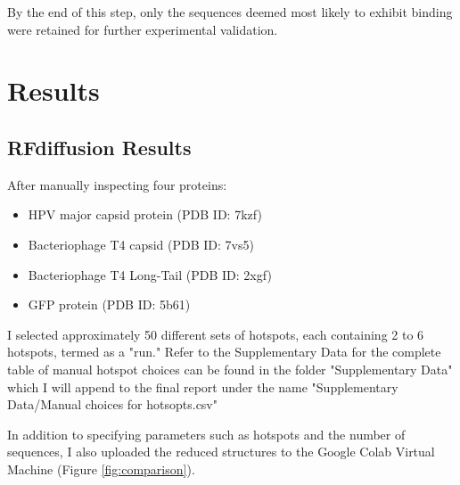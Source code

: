 \documentclass[11pt,a4paper]{article}
\begin{document}
By the end of this step, only the sequences deemed most likely to exhibit binding were retained for further experimental validation.


\section{Results}

\subsection{RFdiffusion Results}

After manually inspecting four proteins:

\begin{itemize}
    \item HPV major capsid protein (PDB ID: 7kzf)
    \item Bacteriophage T4 capsid (PDB ID: 7vs5)
    \item Bacteriophage T4 Long-Tail (PDB ID: 2xgf)
    \item GFP protein (PDB ID: 5b61)
\end{itemize}

I selected approximately 50 different sets of hotspots, each containing 2 to 6 hotspots, termed as a "run." Refer to the Supplementary Data for the complete table of manual hotspot choices can be found in the folder "Supplementary Data" which I will append to the final report under the name "Supplementary Data/Manual choices for hotsopts.csv"

In addition to specifying parameters such as hotspots and the number of sequences, I also uploaded the reduced structures to the Google Colab Virtual Machine (Figure \ref{fig:comparison}).
\end{document}
